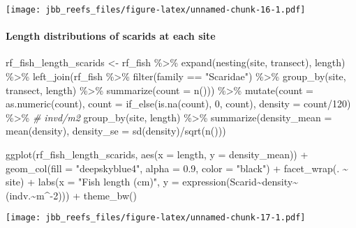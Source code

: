 \documentclass[
]{article}
\newenvironment{Shaded}{\begin{snugshade}}{\end{snugshade}}
\newcommand{\AttributeTok}[1]{\textcolor[rgb]{0.77,0.63,0.00}{#1}}
\newcommand{\CommentTok}[1]{\textcolor[rgb]{0.56,0.35,0.01}{\textit{#1}}}
\newcommand{\DecValTok}[1]{\textcolor[rgb]{0.00,0.00,0.81}{#1}}
\newcommand{\FloatTok}[1]{\textcolor[rgb]{0.00,0.00,0.81}{#1}}
\newcommand{\FunctionTok}[1]{\textcolor[rgb]{0.00,0.00,0.00}{#1}}
\newcommand{\NormalTok}[1]{#1}
\newcommand{\OtherTok}[1]{\textcolor[rgb]{0.56,0.35,0.01}{#1}}
\newcommand{\SpecialCharTok}[1]{\textcolor[rgb]{0.00,0.00,0.00}{#1}}
\newcommand{\StringTok}[1]{\textcolor[rgb]{0.31,0.60,0.02}{#1}}
\begin{document}
\texttt{[image: jbb\_reefs\_files/figure-latex/unnamed-chunk-16-1.pdf]}

\hypertarget{length-distributions-of-scarids-at-each-site}{%
\paragraph{Length distributions of scarids at each
site}\label{length-distributions-of-scarids-at-each-site}}

\begin{Shaded}
\begin{Highlighting}[]
\NormalTok{rf\_fish\_length\_scarids }\OtherTok{\textless{}{-}}\NormalTok{ rf\_fish }\SpecialCharTok{\%\textgreater{}\%}
  \FunctionTok{expand}\NormalTok{(}\FunctionTok{nesting}\NormalTok{(site, transect), length) }\SpecialCharTok{\%\textgreater{}\%}
  \FunctionTok{left\_join}\NormalTok{(rf\_fish }\SpecialCharTok{\%\textgreater{}\%}
        \FunctionTok{filter}\NormalTok{(family }\SpecialCharTok{==} \StringTok{"Scaridae"}\NormalTok{) }\SpecialCharTok{\%\textgreater{}\%}
        \FunctionTok{group\_by}\NormalTok{(site, transect, length) }\SpecialCharTok{\%\textgreater{}\%}
        \FunctionTok{summarize}\NormalTok{(}\AttributeTok{count =} \FunctionTok{n}\NormalTok{())) }\SpecialCharTok{\%\textgreater{}\%}
  \FunctionTok{mutate}\NormalTok{(}\AttributeTok{count =} \FunctionTok{as.numeric}\NormalTok{(count),}
         \AttributeTok{count =} \FunctionTok{if\_else}\NormalTok{(}\FunctionTok{is.na}\NormalTok{(count), }\DecValTok{0}\NormalTok{, count),}
         \AttributeTok{density =}\NormalTok{ count}\SpecialCharTok{/}\DecValTok{120}\NormalTok{) }\SpecialCharTok{\%\textgreater{}\%} \CommentTok{\# invd/m2}
  \FunctionTok{group\_by}\NormalTok{(site, length) }\SpecialCharTok{\%\textgreater{}\%}
  \FunctionTok{summarize}\NormalTok{(}\AttributeTok{density\_mean =} \FunctionTok{mean}\NormalTok{(density),}
            \AttributeTok{density\_se =} \FunctionTok{sd}\NormalTok{(density)}\SpecialCharTok{/}\FunctionTok{sqrt}\NormalTok{(}\FunctionTok{n}\NormalTok{()))}

\FunctionTok{ggplot}\NormalTok{(rf\_fish\_length\_scarids, }\FunctionTok{aes}\NormalTok{(}\AttributeTok{x =}\NormalTok{ length, }\AttributeTok{y =}\NormalTok{ density\_mean)) }\SpecialCharTok{+}
  \FunctionTok{geom\_col}\NormalTok{(}\AttributeTok{fill =} \StringTok{"deepskyblue4"}\NormalTok{, }\AttributeTok{alpha =} \FloatTok{0.9}\NormalTok{, }\AttributeTok{color =} \StringTok{"black"}\NormalTok{) }\SpecialCharTok{+}
  \FunctionTok{facet\_wrap}\NormalTok{(. }\SpecialCharTok{\textasciitilde{}}\NormalTok{ site) }\SpecialCharTok{+}
  \FunctionTok{labs}\NormalTok{(}\AttributeTok{x =} \StringTok{"Fish length (cm)"}\NormalTok{, }\AttributeTok{y =} \FunctionTok{expression}\NormalTok{(Scarid}\SpecialCharTok{\textasciitilde{}}\NormalTok{density}\SpecialCharTok{\textasciitilde{}}\NormalTok{(indv.}\SpecialCharTok{\textasciitilde{}}\NormalTok{m}\SpecialCharTok{\^{}{-}}\DecValTok{2}\NormalTok{))) }\SpecialCharTok{+}
  \FunctionTok{theme\_bw}\NormalTok{()}
\end{Highlighting}
\end{Shaded}

\texttt{[image: jbb\_reefs\_files/figure-latex/unnamed-chunk-17-1.pdf]}
\end{document}
